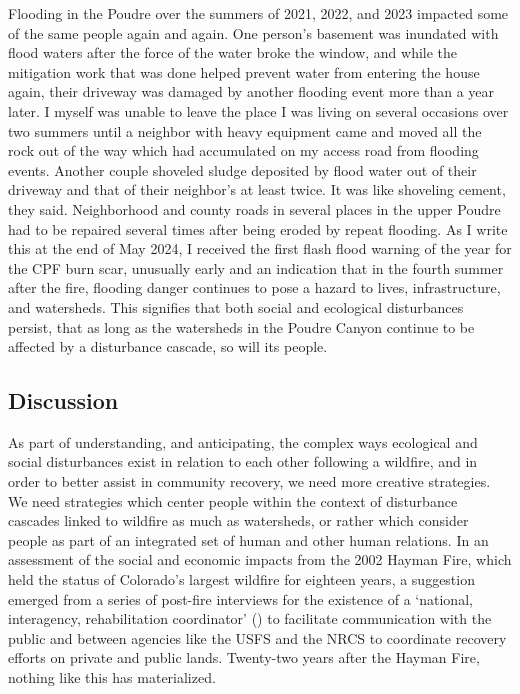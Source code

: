 \documentclass[
]{article}
\begin{document}
Flooding in the Poudre over the summers of 2021, 2022, and 2023 impacted some of the same people again and again. One person's basement was inundated with flood waters after the force of the water broke the window, and while the mitigation work that was done helped prevent water from entering the house again, their driveway was damaged by another flooding event more than a year later. I myself was unable to leave the place I was living on several occasions over two summers until a neighbor with heavy equipment came and moved all the rock out of the way which had accumulated on my access road from flooding events. Another couple shoveled sludge deposited by flood water out of their driveway and that of their neighbor's at least twice. It was like shoveling cement, they said. Neighborhood and county roads in several places in the upper Poudre had to be repaired several times after being eroded by repeat flooding. As I write this at the end of May 2024, I received the first flash flood warning of the year for the CPF burn scar, unusually early and an indication that in the fourth summer after the fire, flooding danger continues to pose a hazard to lives, infrastructure, and watersheds. This signifies that both social and ecological disturbances persist, that as long as the watersheds in the Poudre Canyon continue to be affected by a disturbance cascade, so will its people.

\subsection{Discussion}\label{discussion-2}

As part of understanding, and anticipating, the complex ways ecological and social disturbances exist in relation to each other following a wildfire, and in order to better assist in community recovery, we need more creative strategies. We need strategies which center people within the context of disturbance cascades linked to wildfire as much as watersheds, or rather which consider people as part of an integrated set of human and other human relations. In an assessment of the social and economic impacts from the 2002 Hayman Fire, which held the status of Colorado's largest wildfire for eighteen years, a suggestion emerged from a series of post-fire interviews for the existence of a `national, interagency, rehabilitation coordinator' () to facilitate communication with the public and between agencies like the USFS and the NRCS to coordinate recovery efforts on private and public lands. Twenty-two years after the Hayman Fire, nothing like this has materialized.
\end{document}
